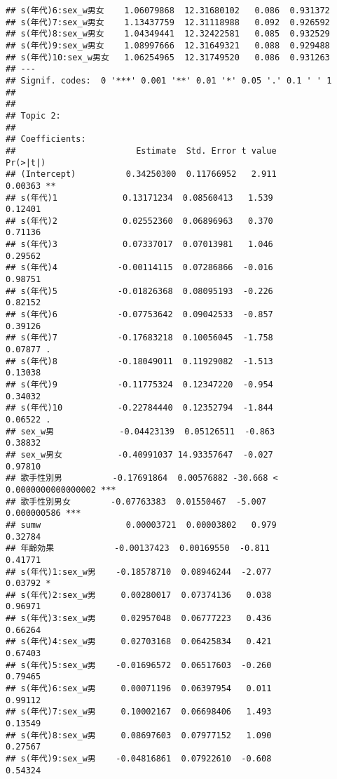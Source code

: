 \documentclass[
]{article}
\begin{document}
\begin{verbatim}
## s(年代)6:sex_w男女    1.06079868  12.31680102   0.086  0.931372    
## s(年代)7:sex_w男女    1.13437759  12.31118988   0.092  0.926592    
## s(年代)8:sex_w男女    1.04349441  12.32422581   0.085  0.932529    
## s(年代)9:sex_w男女    1.08997666  12.31649321   0.088  0.929488    
## s(年代)10:sex_w男女   1.06254965  12.31749520   0.086  0.931263    
## ---
## Signif. codes:  0 '***' 0.001 '**' 0.01 '*' 0.05 '.' 0.1 ' ' 1
## 
## 
## Topic 2:
## 
## Coefficients:
##                        Estimate  Std. Error t value             Pr(>|t|)    
## (Intercept)          0.34250300  0.11766952   2.911              0.00363 ** 
## s(年代)1             0.13171234  0.08560413   1.539              0.12401    
## s(年代)2             0.02552360  0.06896963   0.370              0.71136    
## s(年代)3             0.07337017  0.07013981   1.046              0.29562    
## s(年代)4            -0.00114115  0.07286866  -0.016              0.98751    
## s(年代)5            -0.01826368  0.08095193  -0.226              0.82152    
## s(年代)6            -0.07753642  0.09042533  -0.857              0.39126    
## s(年代)7            -0.17683218  0.10056045  -1.758              0.07877 .  
## s(年代)8            -0.18049011  0.11929082  -1.513              0.13038    
## s(年代)9            -0.11775324  0.12347220  -0.954              0.34032    
## s(年代)10           -0.22784440  0.12352794  -1.844              0.06522 .  
## sex_w男             -0.04423139  0.05126511  -0.863              0.38832    
## sex_w男女           -0.40991037 14.93357647  -0.027              0.97810    
## 歌手性別男          -0.17691864  0.00576882 -30.668 < 0.0000000000000002 ***
## 歌手性別男女        -0.07763383  0.01550467  -5.007          0.000000586 ***
## sumw                 0.00003721  0.00003802   0.979              0.32784    
## 年齢効果            -0.00137423  0.00169550  -0.811              0.41771    
## s(年代)1:sex_w男    -0.18578710  0.08946244  -2.077              0.03792 *  
## s(年代)2:sex_w男     0.00280017  0.07374136   0.038              0.96971    
## s(年代)3:sex_w男     0.02957048  0.06777223   0.436              0.66264    
## s(年代)4:sex_w男     0.02703168  0.06425834   0.421              0.67403    
## s(年代)5:sex_w男    -0.01696572  0.06517603  -0.260              0.79465    
## s(年代)6:sex_w男     0.00071196  0.06397954   0.011              0.99112    
## s(年代)7:sex_w男     0.10002167  0.06698406   1.493              0.13549    
## s(年代)8:sex_w男     0.08697603  0.07977152   1.090              0.27567    
## s(年代)9:sex_w男    -0.04816861  0.07922610  -0.608              0.54324    

\end{verbatim}
\end{document}
